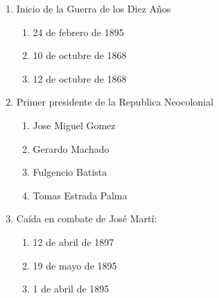 \documentclass[twocolumn]{article}
\begin{document}
\begin{enumerate}



  \item Inicio de la Guerra de los Diez Años

  \begin{enumerate}
   
   \item 24 de febrero de 1895
   
   \item 10 de octubre de 1868
   
   \item 12 de octubre de 1868
   
  \end{enumerate}



  \item Primer presidente de la Republica Neocolonial

  \begin{enumerate}
   
   \item Jose Miguel Gomez
   
   \item Gerardo Machado
   
   \item Fulgencio Batista
   
   \item Tomas Estrada Palma
   
  \end{enumerate}



  \item Caída en combate de José Martí:

  \begin{enumerate}
   
   \item 12 de abril de 1897
   
   \item 19 de mayo de 1895
   
   \item 1 de abril de 1895
   

\end{enumerate}
\end{enumerate}
\end{document}
